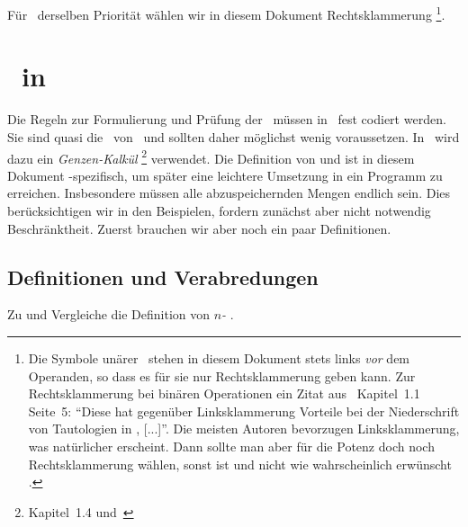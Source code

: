 Für \Operationen\ derselben Priorität wählen wir in diesem Dokument Rechtsklammerung%
\footnote{%
	Die Symbole unärer \Operationen\ stehen in diesem Dokument stets links \emph{vor} dem Operanden, so dass es für sie nur Rechtsklammerung geben kann.
	Zur Rechtsklammerung bei binären Operationen ein Zitat aus~\cite{bib:Rautenberg} Kapitel~1.1 Seite~5:
	"`Diese hat gegenüber Linksklammerung Vorteile bei der Niederschrift von Tautologien in \FrmImp, [...]"'.
	Die meisten Autoren bevorzugen Linksklammerung, was natürlicher erscheint.
	Dann sollte man aber für die Potenz doch noch Rechtsklammerung wählen, sonst ist  und nicht wie wahrscheinlich erwünscht .
}.

\section[Beweise in ASBA]{\Beweise\ in \ASBA}%
\label                {sec-BeweiseASBA}

Die Regeln zur Formulierung und Prüfung der \Beweise\ müssen in \ASBA\ fest codiert werden.
Sie sind quasi die \Axiome\ von \ASBA\ und sollten daher möglichst wenig voraussetzen.
In \ASBA\ wird dazu ein \emph{Genzen-Kalkül}%
\footnote{%
	 Kapitel~1.4 und~\cite{bib:Schlussregel,bib:NatuerlichesSchliessen}
} verwendet.
Die Definition von \emph{\Schlussregel} und \emph{\Beweis} ist in diesem Dokument \ASBA-spezifisch, um später eine leichtere Umsetzung in ein Programm zu erreichen.
Insbesondere müssen alle abzuspeichernden Mengen endlich sein.
Dies berücksichtigen wir in den Beispielen, fordern zunächst aber nicht notwendig Beschränktheit.
Zuerst brauchen wir aber noch ein paar Definitionen.

\subsection{Definitionen und Verabredungen}%
\label                  {sub-Verabredungen}

Zu \chrqt{\MtsLen} und \chrqt{\MtsSet} Vergleiche die Definition von \emph{$n$-\Tupel} .

